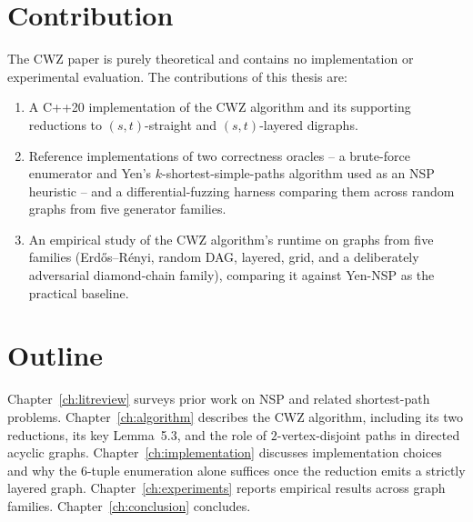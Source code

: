 \section{Contribution}

The CWZ paper is purely theoretical and contains no implementation or
experimental evaluation. The contributions of this thesis are:
\begin{enumerate}
  \item A C++20 implementation of the CWZ algorithm and its supporting
    reductions to $(s,t)$-straight and $(s,t)$-layered digraphs.
  \item Reference implementations of two correctness oracles -- a brute-force
    enumerator and Yen's $k$-shortest-simple-paths algorithm used as an NSP
    heuristic -- and a differential-fuzzing harness comparing them across
    random graphs from five generator families.
  \item An empirical study of the CWZ algorithm's runtime on graphs from
    five families (Erd\H{o}s--R\'enyi, random DAG, layered, grid, and a
    deliberately adversarial diamond-chain family), comparing it against
    Yen-NSP as the practical baseline.
\end{enumerate}

\section{Outline}

Chapter~\ref{ch:litreview} surveys prior work on NSP and related shortest-path
problems. Chapter~\ref{ch:algorithm} describes the CWZ algorithm, including
its two reductions, its key Lemma~5.3, and the role of $2$-vertex-disjoint
paths in directed acyclic graphs. Chapter~\ref{ch:implementation} discusses
implementation choices and why the $6$-tuple enumeration alone
suffices once the reduction emits a strictly layered graph. Chapter~\ref{ch:experiments} reports empirical
results across graph families. Chapter~\ref{ch:conclusion} concludes.
